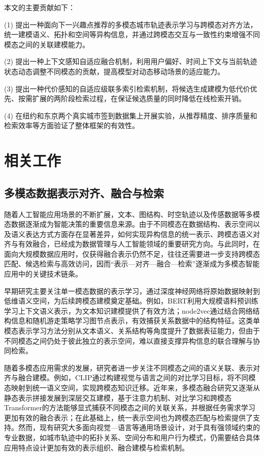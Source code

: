 \documentclass{rjthesis}
\begin{document}
本文的主要贡献如下：

(1) 提出一种面向下一兴趣点推荐的多模态城市轨迹表示学习与跨模态对齐方法，统一建模语义、拓扑和空间等异构信息，并通过跨模态交互与一致性约束增强不同模态之间的关联建模能力。

(2) 提出一种上下文感知自适应融合机制，利用用户偏好、时间上下文与当前轨迹状态动态调整不同模态的贡献，提高模型对动态移动场景的适应能力。

(3) 提出一种代价感知的自适应级联多索引检索机制，将候选生成建模为低代价优先、按需扩展的两阶段检索过程，在保证候选质量的同时降低在线检索开销。

(4) 在纽约和东京两个真实城市签到数据集上开展实验，从推荐精度、排序质量和检索效率等方面验证了整体框架的有效性。

\section{相关工作}

\subsection{多模态数据表示对齐、融合与检索}

随着人工智能应用场景的不断扩展，文本、图结构、时空轨迹以及传感数据等多模态数据逐渐成为智能决策的重要信息来源。由于不同模态在数据结构、表示空间以及语义表达方式方面存在显著差异，如何实现异构信息的统一表示、跨模态语义对齐与有效融合，已经成为数据管理与人工智能领域的重要研究方向。与此同时，在面向大规模数据应用时，仅获得融合表示仍然不足，往往还需要进一步支持跨模态匹配、候选检索与高效访问，因而“表示—对齐—融合—检索”逐渐成为多模态智能应用中的关键技术链条。

早期研究主要关注单一模态数据的表示学习，通过深度神经网络将原始数据映射到低维语义空间，为后续跨模态建模奠定基础。例如，BERT利用大规模语料预训练学习上下文语义表示，为文本知识建模提供了有效方法\cite{devlin2019bert}；node2vec通过结合网络结构信息和随机游走策略学习图节点表示，有效捕获关系数据中的结构特征\cite{grover2016node2vec}。这类单模态表示学习方法分别从文本语义、关系结构等角度提升了数据表征能力，但由于不同模态之间仍处于彼此独立的表示空间，难以直接支撑异构信息的联合理解与协同检索。

随着多模态应用需求的发展，研究者进一步关注不同模态之间的语义关联、表示对齐与融合建模。例如，CLIP通过构建视觉与语言之间的对比学习目标，将不同模态映射到统一语义空间，实现跨模态知识迁移\cite{radford2021clip}。近年来，多模态融合研究又逐渐从静态表示拼接发展到深层交互建模，基于注意力机制、对比学习和跨模态Transformer的方法能够显式捕获不同模态之间的关联关系，并根据任务需求学习更加有效的融合表示；在此基础上，统一表示空间也为跨模态匹配与检索提供了支持。然而，现有研究大多面向视觉—语言等通用场景设计，对于具有强领域约束的专业数据，如城市轨迹中的拓扑关系、空间分布和用户行为模式，仍需要结合具体应用特点设计更加有效的表示组织、融合建模与检索机制。
\end{document}
